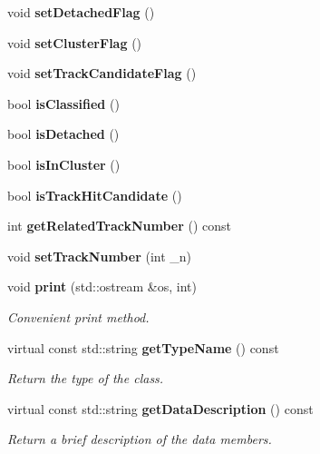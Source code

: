 \begin{DoxyCompactItemize}
\item 
void {\bfseries set\-Detached\-Flag} ()\label{classCALICE_1_1HitVariables_a097c386ab0eb255a48092b6cc8202485}

\item 
void {\bfseries set\-Cluster\-Flag} ()\label{classCALICE_1_1HitVariables_a0440b87369eeab72aea1a060ce1abd9f}

\item 
void {\bfseries set\-Track\-Candidate\-Flag} ()\label{classCALICE_1_1HitVariables_a390281d414ad61de865b4c1299c9b200}

\item 
bool {\bfseries is\-Classified} ()\label{classCALICE_1_1HitVariables_a4d5f5cbb06acfea7ee0767ffac2eafcb}

\item 
bool {\bfseries is\-Detached} ()\label{classCALICE_1_1HitVariables_a1c1f0b0a72ee4dcf833119b2e53972ee}

\item 
bool {\bfseries is\-In\-Cluster} ()\label{classCALICE_1_1HitVariables_a499c4371d55f51fe8c1365efa993c685}

\item 
bool {\bfseries is\-Track\-Hit\-Candidate} ()\label{classCALICE_1_1HitVariables_a975c786810f9413871fcd37c57b613ab}

\item 
int {\bfseries get\-Related\-Track\-Number} () const \label{classCALICE_1_1HitVariables_a6d180fcafb2f16aeaf45583a1841333b}

\item 
void {\bfseries set\-Track\-Number} (int \-\_\-n)\label{classCALICE_1_1HitVariables_abbba1223573e241d3830f02f96dda561}

\item 
void {\bf print} (std\-::ostream \&os, int)\label{classCALICE_1_1HitVariables_a9a6ba8834c7423850d382bcf17712757}

\begin{DoxyCompactList}\small\item\em Convenient print method. \end{DoxyCompactList}\item 
virtual const std\-::string {\bf get\-Type\-Name} () const \label{classCALICE_1_1HitVariables_a0b51bd0cd8f4516c0258c535be1366dc}

\begin{DoxyCompactList}\small\item\em Return the type of the class. \end{DoxyCompactList}\item 
virtual const std\-::string {\bf get\-Data\-Description} () const \label{classCALICE_1_1HitVariables_a78ecc8b0fd5ad3e0c49b6350d8034d50}

\begin{DoxyCompactList}\small\item\em Return a brief description of the data members. \end{DoxyCompactList}\end{DoxyCompactItemize}


